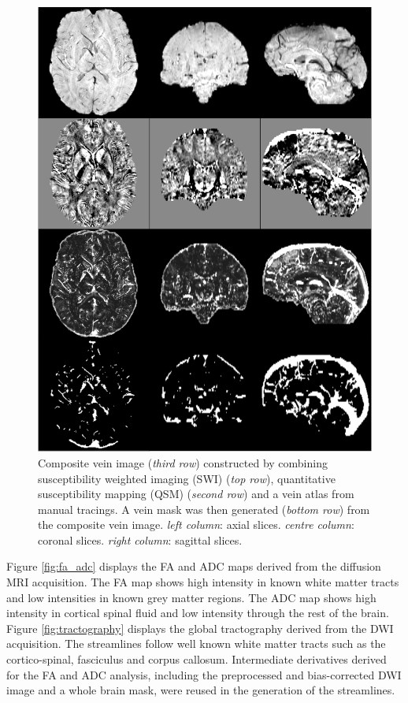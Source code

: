 \documentclass[smallextended]{svjour3}       %
\begin{document}
\begin{figure}
    \centering
    \includegraphics[width=\textwidth]{../figures/veins}
  \caption{Composite vein image (\emph{third row}) constructed by
  combining susceptibility weighted imaging (SWI) (\emph{top row}),
  quantitative susceptibility mapping (QSM) (\emph{second row})
  and a vein atlas from manual tracings. A vein mask was then
  generated (\emph{bottom row}) from the composite
  vein image.
  \emph{left column}: axial slices. \emph{centre column}: coronal slices.
  \emph{right column}: sagittal slices.}
\label{fig:veins}
\end{figure}

Figure \ref{fig:fa_adc}  displays the FA and ADC maps derived from the diffusion MRI
acquisition. The FA map shows high intensity in known white matter
tracts and low intensities in known grey matter regions. The ADC map
shows high intensity in cortical spinal fluid and low intensity through
the rest of the brain.
Figure \ref{fig:tractography} displays the global tractography derived from the DWI
acquisition. The streamlines follow well known white matter tracts such
as the cortico-spinal, fasciculus and corpus callosum. Intermediate
derivatives derived for the FA and ADC analysis, including the
preprocessed and bias-corrected DWI image and a whole brain mask, were
reused in the generation of the streamlines.
\end{document}

